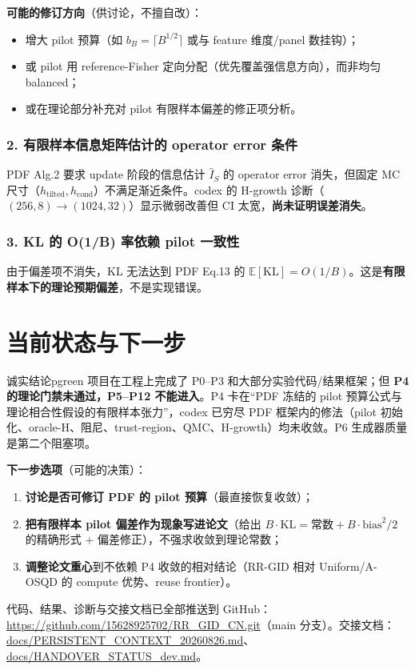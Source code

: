 \documentclass[11pt,a4paper]{ctexart}
\begin{document}
\textbf{可能的修订方向}（供讨论，不擅自改）：
\begin{itemize}
  \item 增大 pilot 预算（如 $b_B=\lceil B^{1/2}\rceil$ 或与 feature 维度/panel 数挂钩）；
  \item 或 pilot 用 reference-Fisher 定向分配（优先覆盖强信息方向），而非均匀 balanced；
  \item 或在理论部分补充对 pilot 有限样本偏差的修正项分析。
\end{itemize}

\subsubsection{2. 有限样本信息矩阵估计的 operator error 条件}
PDF Alg.2 要求 update 阶段的信息估计 $\hat I_S$ 的 operator error 消失，但固定 MC 尺寸（$h_{\text{tilted}}, h_{\text{cond}}$）不满足渐近条件。codex 的 H-growth 诊断（$(256,8)\to(1024,32)$）显示微弱改善但 CI 太宽，\textbf{尚未证明误差消失}。

\subsubsection{3. KL 的 O(1/B) 率依赖 pilot 一致性}
由于偏差项不消失，KL 无法达到 PDF Eq.13 的 $\mathbb{E}[\mathrm{KL}]=O(1/B)$。这是\textbf{有限样本下的理论预期偏差}，不是实现错误。

\section{当前状态与下一步}
\begin{keybox}{诚实结论}{pgreen}
项目在工程上完成了 P0--P3 和大部分实验代码/结果框架；但 \textbf{P4 的理论门禁未通过，P5--P12 不能进入}。P4 卡在“PDF 冻结的 pilot 预算公式与理论相合性假设的有限样本张力”，codex 已穷尽 PDF 框架内的修法（pilot 初始化、oracle-H、阻尼、trust-region、QMC、H-growth）均未收敛。P6 生成器质量是第二个阻塞项。
\end{keybox}

\textbf{下一步选项}（可能的决策）：
\begin{enumerate}
  \item \textbf{讨论是否可修订 PDF 的 pilot 预算}（最直接恢复收敛）；
  \item \textbf{把有限样本 pilot 偏差作为现象写进论文}（给出 $B\cdot\mathrm{KL}=\text{常数}+B\cdot\text{bias}^2/2$ 的精确形式 + 偏差修正），不强求收敛到理论常数；
  \item \textbf{调整论文重心}到不依赖 P4 收敛的相对结论（RR-GID 相对 Uniform/A-OSQD 的 compute 优势、reuse frontier）。
\end{enumerate}

{\sloppy 代码、结果、诊断与交接文档已全部推送到 GitHub：\url{https://github.com/15628925702/RR_GID_CN.git}（main 分支）。交接文档：\url{docs/PERSISTENT_CONTEXT_20260826.md}、\url{docs/HANDOVER_STATUS_dev.md}。\par}
\end{document}

